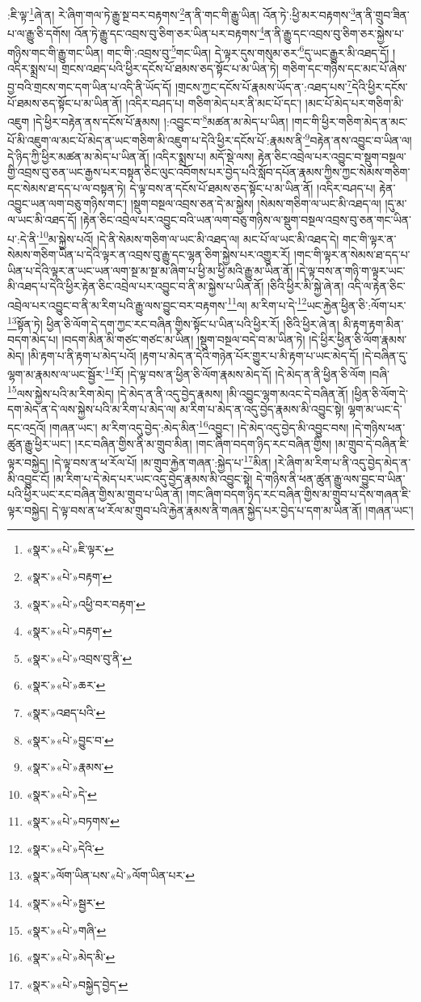 :ཇི་ལྟ་\footnote{«སྣར་»«པེ་»ཇི་ལྟར་}ཞེ་ན། རེ་ཞིག་གལ་ཏེ་རྒྱུ་སྔ་བར་བརྟགས་\footnote{«སྣར་»«པེ་»བརྟག་}ན་ནི་གང་གི་རྒྱུ་ཡིན། འོན་ཏེ་:ཕྱི་མར་བརྟགས་\footnote{«སྣར་»«པེ་»འཕྱི་བར་བརྟག་}ན་ནི་གྲུབ་ཟིན་པ་ལ་རྒྱུ་ཅི་དགོས། འོན་ཏེ་རྒྱུ་དང་འབྲས་བུ་ཅིག་ཅར་ཡིན་པར་བརྟགས་\footnote{«སྣར་»«པེ་»བརྟག་}ན་ནི་རྒྱུ་དང་འབྲས་བུ་ཅིག་ཅར་སྐྱེས་པ་གཉིས་གང་གི་རྒྱུ་གང་ཡིན། གང་གི་:འབྲས་བུ་\footnote{«སྣར་»«པེ་»འབྲས་བུ་ནི་}གང་ཡིན། དེ་ལྟར་དུས་གསུམ་ཅར་\footnote{«སྣར་»«པེ་»ཆར་}དུ་ཡང་རྒྱུར་མི་འཐད་དོ། །འདིར་སྨྲས་པ། གྲངས་འཐད་པའི་ཕྱིར་དངོས་པོ་ཐམས་ཅད་སྟོང་པ་མ་ཡིན་ཏེ། གཅིག་དང་གཉིས་དང་མང་པོ་ཞེས་བྱ་བའི་གྲངས་གང་དག་ཡིན་པ་འདི་ནི་ཡོད་དོ། །གྲངས་ཀྱང་དངོས་པོ་རྣམས་ཡོད་ན་:འཐད་པས་\footnote{«སྣར་»འཐད་པའི་}དེའི་ཕྱིར་དངོས་པོ་ཐམས་ཅད་སྟོང་པ་མ་ཡིན་ནོ། །འདིར་བཤད་པ། གཅིག་མེད་པར་ནི་མང་པོ་དང་། །མང་པོ་མེད་པར་གཅིག་མི་འཇུག །དེ་ཕྱིར་བརྟེན་ནས་དངོས་པོ་རྣམས། །:འབྱུང་བ་\footnote{«སྣར་»«པེ་»བྱུང་བ་}མཚན་མ་མེད་པ་ཡིན། །གང་གི་ཕྱིར་གཅིག་མེད་ན་མང་པོ་མི་འཇུག་ལ་མང་པོ་མེད་ན་ཡང་གཅིག་མི་འཇུག་པ་དེའི་ཕྱིར་དངོས་པོ་:རྣམས་ནི་\footnote{«སྣར་»«པེ་»རྣམས་}བརྟེན་ནས་འབྱུང་བ་ཡིན་ལ། དེ་ཉིད་ཀྱི་ཕྱིར་མཚན་མ་མེད་པ་ཡིན་ནོ། །འདིར་སྨྲས་པ། མདོ་སྡེ་ལས། རྟེན་ཅིང་འབྲེལ་པར་འབྱུང་བ་སྡུག་བསྔལ་གྱི་འབྲས་བུ་ཅན་ཡང་རྒྱས་པར་བསྟན་ཅིང་ལུང་འབོགས་པར་བྱེད་པའི་སློབ་དཔོན་རྣམས་ཀྱིས་ཀྱང་སེམས་གཅིག་དང་སེམས་ཐ་དད་པ་ལ་བསྟན་ཏེ། དེ་ལྟ་བས་ན་དངོས་པོ་ཐམས་ཅད་སྟོང་པ་མ་ཡིན་ནོ། །འདིར་བཤད་པ། རྟེན་འབྱུང་ཡན་ལག་བཅུ་གཉིས་གང་། །སྡུག་བསྔལ་འབྲས་ཅན་དེ་མ་སྐྱེས། །སེམས་གཅིག་ལ་ཡང་མི་འཐད་ལ། །དུ་མ་ལ་ཡང་མི་འཐད་དོ། །རྟེན་ཅིང་འབྲེལ་པར་འབྱུང་བའི་ཡན་ལག་བཅུ་གཉིས་ལ་སྡུག་བསྔལ་འབྲས་བུ་ཅན་གང་ཡིན་པ་:དེ་ནི་\footnote{«སྣར་»«པེ་»དེ་}མ་སྐྱེས་པའོ། །དེ་ནི་སེམས་གཅིག་ལ་ཡང་མི་འཐད་ལ། མང་པོ་ལ་ཡང་མི་འཐད་དེ། གང་གི་ལྟར་ན་སེམས་གཅིག་ཡིན་པ་དེའི་ལྟར་ན་འབྲས་བུ་རྒྱུ་དང་ལྷན་ཅིག་སྐྱེས་པར་འགྱུར་རོ། །གང་གི་ལྟར་ན་སེམས་ཐ་དད་པ་ཡིན་པ་དེའི་ལྟར་ན་ཡང་ཡན་ལག་སྔ་མ་སྔ་མ་ཞིག་པ་ཕྱི་མ་ཕྱི་མའི་རྒྱུ་མ་ཡིན་ནོ། །དེ་ལྟ་བས་ན་གཉི་ག་ལྟར་ཡང་མི་འཐད་པ་དེའི་ཕྱིར་རྟེན་ཅིང་འབྲེལ་པར་འབྱུང་བ་ནི་མ་སྐྱེས་པ་ཡིན་ནོ། །ཅིའི་ཕྱིར་མི་སྐྱེ་ཞེ་ན། འདི་ལ་རྟེན་ཅིང་འབྲེལ་པར་འབྱུང་བ་ནི་མ་རིག་པའི་རྒྱུ་ལས་བྱུང་བར་བརྟགས་\footnote{«སྣར་»«པེ་»བཏགས་}ལ། མ་རིག་པ་དེ་\footnote{«སྣར་»«པེ་»དེའི་}ཡང་རྐྱེན་ཕྱིན་ཅི་:ལོག་པར་\footnote{«སྣར་»ལོག་ཡིན་པས་«པེ་»ལོག་ཡིན་པར་}སྟོན་ཏེ། ཕྱིན་ཅི་ལོག་དེ་དག་ཀྱང་རང་བཞིན་གྱིས་སྟོང་པ་ཡིན་པའི་ཕྱིར་རོ། །ཅིའི་ཕྱིར་ཞེ་ན། མི་རྟག་རྟག་མིན་བདག་མེད་པ། །བདག་མིན་མི་གཙང་གཙང་མ་ཡིན། །སྡུག་བསྔལ་བདེ་བ་མ་ཡིན་ཏེ། །དེ་ཕྱིར་ཕྱིན་ཅི་ལོག་རྣམས་མེད། །མི་རྟག་པ་ནི་རྟག་པ་མེད་པའོ། །རྟག་པ་མེད་ན་དེའི་གཉེན་པོར་གྱུར་པ་མི་རྟག་པ་ཡང་མེད་དོ། །དེ་བཞིན་དུ་ལྷག་མ་རྣམས་ལ་ཡང་སྦྱོར་\footnote{«སྣར་»«པེ་»སྦྱར་}རོ། །དེ་ལྟ་བས་ན་ཕྱིན་ཅི་ལོག་རྣམས་མེད་དོ། །དེ་མེད་ན་ནི་ཕྱིན་ཅི་ལོག །བཞི་\footnote{«སྣར་»«པེ་»གཞི་}ལས་སྐྱེས་པའི་མ་རིག་མེད། །དེ་མེད་ན་ནི་འདུ་བྱེད་རྣམས། །མི་འབྱུང་ལྷག་མའང་དེ་བཞིན་ནོ། །ཕྱིན་ཅི་ལོག་དེ་དག་མེད་ན་དེ་ལས་སྐྱེས་པའི་མ་རིག་པ་མེད་ལ། མ་རིག་པ་མེད་ན་འདུ་བྱེད་རྣམས་མི་འབྱུང་སྟེ། ལྷག་མ་ཡང་དེ་དང་འདྲའོ། །གཞན་ཡང་། མ་རིག་འདུ་བྱེད་:མེད་མིན་\footnote{«སྣར་»«པེ་»མེད་མི་}འབྱུང་། །དེ་མེད་འདུ་བྱེད་མི་འབྱུང་བས། །དེ་གཉིས་ཕན་ཚུན་རྒྱུ་ཕྱིར་ཡང་། །རང་བཞིན་གྱིས་ནི་མ་གྲུབ་མིན། །གང་ཞིག་བདག་ཉིད་རང་བཞིན་གྱིས། །མ་གྲུབ་དེ་བཞིན་ཇི་ལྟར་བསྐྱེད། །དེ་ལྟ་བས་ན་ཕ་རོལ་པོ། །མ་གྲུབ་རྐྱེན་གཞན་:སྐྱེད་པ་\footnote{«སྣར་»«པེ་»བསྐྱེད་བྱེད་}མིན། །རེ་ཞིག་མ་རིག་པ་ནི་འདུ་བྱེད་མེད་ན་མི་འབྱུང་ངོ། །མ་རིག་པ་དེ་མེད་པར་ཡང་འདུ་བྱེད་རྣམས་མི་འབྱུང་སྟེ། དེ་གཉིས་ནི་ཕན་ཚུན་རྒྱུ་ལས་བྱུང་བ་ཡིན་པའི་ཕྱིར་ཡང་རང་བཞིན་གྱིས་མ་གྲུབ་པ་ཡིན་ནོ། །གང་ཞིག་བདག་ཉིད་རང་བཞིན་གྱིས་མ་གྲུབ་པ་དེས་གཞན་ཇི་ལྟར་བསྐྱེད། དེ་ལྟ་བས་ན་ཕ་རོལ་མ་གྲུབ་པའི་རྐྱེན་རྣམས་ནི་གཞན་སྐྱེད་པར་བྱེད་པ་དག་མ་ཡིན་ནོ། །གཞན་ཡང་། 